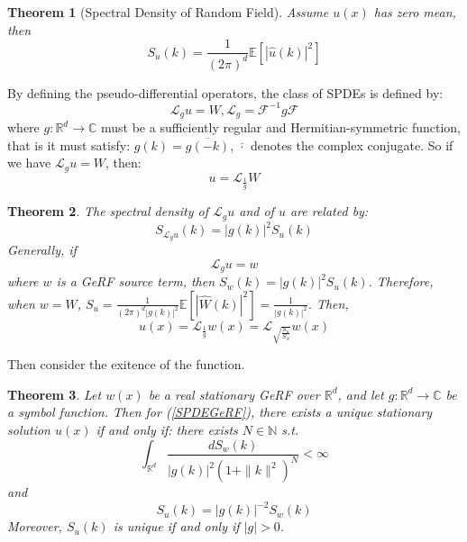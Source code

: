 \documentclass{article}
\newtheorem{theorem}{Theorem}
\begin{document}
\begin{theorem}[Spectral Density of Random Field]\label{spectral_density_random_field}
	Assume $u(x)$ has zero mean, then 
\begin{equation}\label{spectraldensity}
	S_u(k)=\frac{1}{(2\pi)^{d}}\mathbb{E}[|\hat{u}(k)|^2]
\end{equation}
\end{theorem}




By defining the pseudo-differential operators, the class of SPDEs is defined by:
\begin{equation}
	\mathcal{L}_gu = W, \mathcal{L}_g = \mathcal{F}^{-1}g\mathcal{F}
\end{equation}
where $g:\mathbb{R}^d\rightarrow \mathbb{C}$ must be a sufficiently regular and Hermitian-symmetric function, that is it must satisfy: $g(k) = \overline{g(-k)}$, $\overline{\cdot}$ denotes the complex conjugate.
So if we have $\mathcal{L}_gu = W$, then:
\begin{equation}
	u=\mathcal{L}_{\frac{1}{g}}W
\end{equation}

\begin{theorem}
	The spectral density of $\mathcal{L}_gu$ and of $u$ are related by:
	\begin{equation}
		S_{\mathcal{L}_gu}(k) = \left|g(k)\right|^2S_u(k)
	\end{equation}
	Generally, if 
	\begin{equation}\label{SPDEGeRF}
		\mathcal{L}_gu = w
	\end{equation}
	where $w$ is a GeRF source term, then $S_w(k) = \left|g(k)\right|^2S_u(k)$.
	Therefore, when $w = W$, $S_u =\frac{1}{(2\pi)^{d}\left|g(k)\right|^2}\mathbb{E}[|\hat{W}(k)|^2]=\frac{1}{\left|g(k)\right|^2}$. 
  Then, 
\begin{equation}
	u(x) =\mathcal{L}_{\frac{1}{g}}w(x) = \mathcal{L}_{\sqrt{\frac{S_u}{S_w}}}w(x)
\end{equation}
\end{theorem}

Then consider the exitence of the function.
\begin{theorem}
	Let $w(x)$ be a real stationary GeRF over $\mathbb{R}^d$, and let $g:\mathbb{R}^d\rightarrow \mathbb{C}$ be a symbol function. 
	Then for (\ref{SPDEGeRF}), there exists a unique stationary solution $u(x)$ if and only if:
	there exists $N\in \mathbb{N}$ s.t. 
	\begin{equation}
		\int_{\mathbb{R}^d}\frac{dS_w(k)}{\left|g(k)\right|^2(1+\|k\|^2)^N} < \infty
	\end{equation}
	and 
	\begin{equation}
		S_u(k) = \left|g(k)\right|^{-2}S_w(k)
	\end{equation}
	Moreover, $S_u(k)$ is unique if and only if $\left|g\right|>0$.
\end{theorem}
\end{document}
